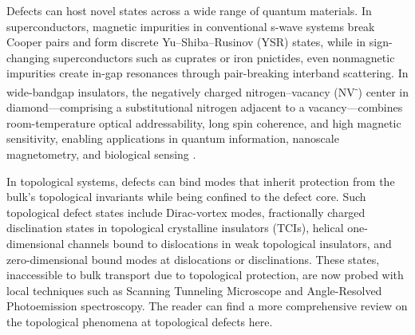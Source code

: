 Defects can host novel states across a wide range of quantum materials. In superconductors, magnetic impurities in conventional s-wave systems break Cooper pairs and form discrete Yu–Shiba–Rusinov (YSR) states\cite{pasnooriRiseFallYuShibaRusinov2022}\cite{ortuzarYuShibaRusinovStatesTwodimensional2022}, while in sign-changing superconductors such as cuprates or iron pnictides, even nonmagnetic impurities create in-gap resonances through pair-breaking interband scattering\cite{mashkooriImpurityBoundStates2017}\cite{alloulDefectsCorrelatedMetals2009}. In wide-bandgap insulators, the negatively charged nitrogen–vacancy (NV\textsuperscript{-}) center in diamond—comprising a substitutional nitrogen adjacent to a vacancy—combines room-temperature optical addressability, long spin coherence, and high magnetic sensitivity, enabling applications in quantum information, nanoscale magnetometry, and biological sensing \cite{dohertyNitrogenvacancyColourCentre2013}.

In topological systems, defects can bind modes that inherit protection from the bulk’s topological invariants while being confined to the defect core. Such topological defect states include Dirac-vortex modes\cite{gaoMajoranalikeZeroModes2019}\cite{menssenPhotonicTopologicalMode2020}, fractionally charged disclination states in topological crystalline insulators (TCIs)\cite{liuBulkdisclinationCorrespondenceTopological2021}\cite{petersonTrappedFractionalCharges2021}, helical one-dimensional channels bound to dislocations in weak topological insulators\cite{nayakResolvingTopologicalClassification2019}\cite{yeTopologicalDislocationModes2022}\cite{xueObservationDislocationInducedTopological2021}, and zero-dimensional bound modes at dislocations or disclinations\cite{grinbergTrappedStateDislocation2020}\cite{pauloseTopologicalModesBound2015}\cite{liTopologicalLighttrappingDislocation2018}\cite{dengObservationDegenerateZeroEnergy2022}. These states, inaccessible to bulk transport due to topological protection, are now probed with local techniques such as Scanning Tunneling Microscope and Angle-Resolved Photoemission spectroscopy. The reader can find a more comprehensive review on the topological phenomena at topological defects here\cite{linTopologicalPhenomenaTopological2022}.

